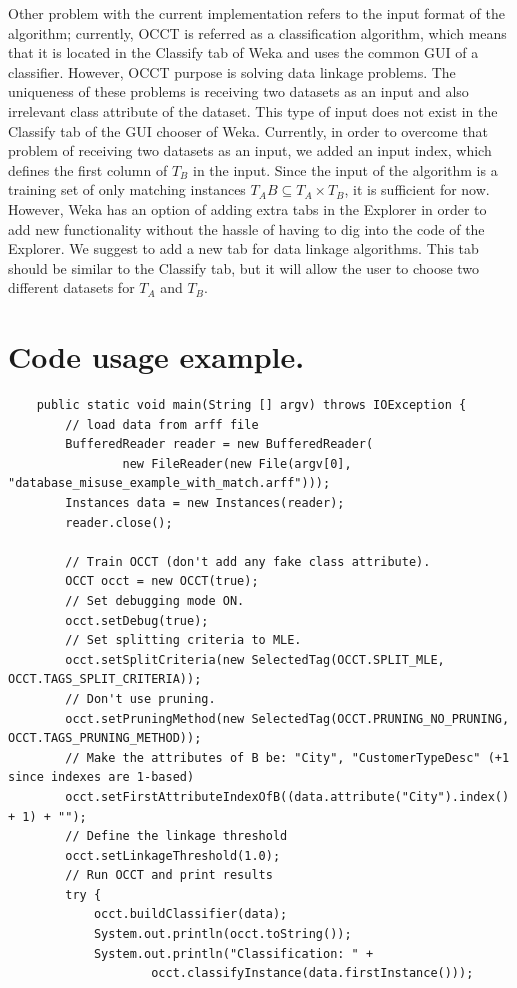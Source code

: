 \documentclass[a4paper,12pt]{article}
\begin{document}
\begin{spacing}{1.5}
Other problem with the current implementation refers to the input format of the algorithm; currently, OCCT is referred as a classification algorithm, which means that it is located in the Classify tab of Weka and uses the common GUI of a classifier. However, OCCT purpose is solving data linkage problems. The uniqueness of these problems is receiving two datasets as an input and also irrelevant class attribute of the dataset. This type of input does not exist in the Classify tab of the GUI chooser of Weka. Currently, in order to overcome that problem of receiving two datasets as an input, we added an input index, which defines the first column of $T_B$ in the input. Since the input of the algorithm is a training set of only matching instances $T_AB \subseteq T_A \times T_B$, it is sufficient for now. However, Weka has an option of adding extra tabs in the Explorer in order to add new functionality without the hassle of having to dig into the code of the Explorer. We suggest to add a new tab for data linkage algorithms. This tab should be similar to the Classify tab, but it will allow the user to choose two different datasets for $T_A$ and $T_B$.





\clearpage
\section{Code usage example.}
\begin{lstlisting}
	public static void main(String [] argv) throws IOException {
		// load data from arff file
		BufferedReader reader = new BufferedReader(
				new FileReader(new File(argv[0], "database_misuse_example_with_match.arff")));
		Instances data = new Instances(reader);
		reader.close();
        
        // Train OCCT (don't add any fake class attribute).
		OCCT occt = new OCCT(true);
        // Set debugging mode ON.
		occt.setDebug(true);
        // Set splitting criteria to MLE.
        occt.setSplitCriteria(new SelectedTag(OCCT.SPLIT_MLE, OCCT.TAGS_SPLIT_CRITERIA));
        // Don't use pruning.
        occt.setPruningMethod(new SelectedTag(OCCT.PRUNING_NO_PRUNING, OCCT.TAGS_PRUNING_METHOD));
        // Make the attributes of B be: "City", "CustomerTypeDesc" (+1 since indexes are 1-based)
		occt.setFirstAttributeIndexOfB((data.attribute("City").index() + 1) + "");
        // Define the linkage threshold
		occt.setLinkageThreshold(1.0);
        // Run OCCT and print results
        try {
			occt.buildClassifier(data);
			System.out.println(occt.toString());
			System.out.println("Classification: " +
					occt.classifyInstance(data.firstInstance()));


\end{lstlisting}
\end{spacing}
\end{document}
